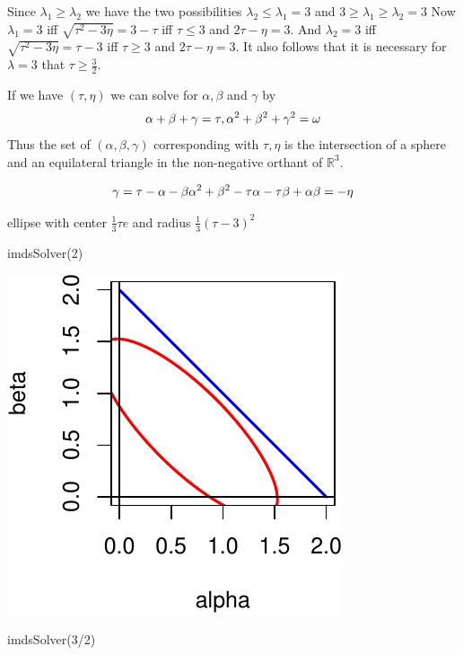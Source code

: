 \documentclass[
  12pt,
  letterpaper,
  DIV=11,
  numbers=noendperiod]{scrreprt}
\newenvironment{Shaded}{\begin{snugshade}}{\end{snugshade}}
\newcommand{\DecValTok}[1]{\textcolor[rgb]{0.68,0.00,0.00}{#1}}
\newcommand{\FunctionTok}[1]{\textcolor[rgb]{0.28,0.35,0.67}{#1}}
\newcommand{\NormalTok}[1]{\textcolor[rgb]{0.00,0.23,0.31}{#1}}
\newcommand{\SpecialCharTok}[1]{\textcolor[rgb]{0.37,0.37,0.37}{#1}}
\theoremstyle{remark}
\begin{document}
Since \(\lambda_1\geq\lambda_2\) we have the two possibilities
\(\lambda_2\leq\lambda_1=3\) and \(3\geq\lambda_1\geq\lambda_2=3\) Now
\(\lambda_1=3\) iff \(\sqrt{\tau^2-3\eta}=3-\tau\) iff \(\tau\leq 3\)
and \(2\tau-\eta=3\). And \(\lambda_2=3\) iff
\(\sqrt{\tau^2-3\eta}=\tau-3\) iff \(\tau\geq 3\) and \(2\tau-\eta=3\).
It also follows that it is necessary for \(\lambda=3\) that
\(\tau\geq\frac32\).

If we have \((\tau,\eta)\) we can solve for \(\alpha,\beta\) and
\(\gamma\) by \[
\alpha+\beta+\gamma=\tau,\\
\alpha^2+\beta^2+\gamma^2=\omega
\] Thus the set of \((\alpha,\beta,\gamma)\) corresponding with
\(\tau,\eta\) is the intersection of a sphere and an equilateral
triangle in the non-negative orthant of \(\mathbb{R}^3\).

\[
\gamma=\tau-\alpha-\beta\\
\alpha^2+\beta^2-\tau\alpha-\tau\beta+\alpha\beta=-\eta
\]

ellipse with center \(\frac13\tau e\) and radius \(\frac13(\tau-3)^2\)

\begin{Shaded}
\begin{Highlighting}[]
\FunctionTok{imdsSolver}\NormalTok{(}\DecValTok{2}\NormalTok{)}
\end{Highlighting}
\end{Shaded}

\includegraphics{inverse_files/figure-pdf/unnamed-chunk-3-1.pdf}

\begin{Shaded}
\begin{Highlighting}[]
\FunctionTok{imdsSolver}\NormalTok{(}\DecValTok{3}\SpecialCharTok{/}\DecValTok{2}\NormalTok{)}
\end{Highlighting}
\end{Shaded}
\end{document}
